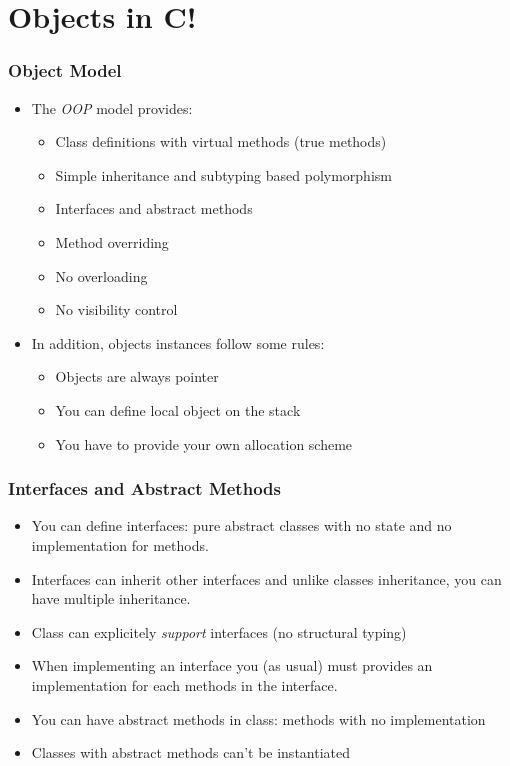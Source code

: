 \documentclass{beamer}
\newcommand{\cbang}{{\bf C!}}
\begin{document}
\section{Objects in \cbang{}}

\begin{frame}
  \frametitle{Object Model}
  \begin{itemize}
  \item The \emph{OOP} model provides:
    \begin{itemize}
    \item Class definitions with virtual methods (true methods)
    \item Simple inheritance and subtyping based polymorphism
    \item Interfaces and abstract methods
    \item Method overriding
    \item No overloading
    \item No visibility control
    \end{itemize}
  \item In addition, objects instances follow some rules:
    \begin{itemize}
    \item Objects are always pointer
    \item You can define local object on the stack
    \item You have to provide your own allocation scheme
    \end{itemize}
  \end{itemize}
\end{frame}

\begin{frame}
  \frametitle{Interfaces and Abstract Methods}
  \begin{itemize}
  \item You can define interfaces: pure abstract classes with no state and no
    implementation for methods.
  \item Interfaces can inherit other interfaces and unlike classes
    inheritance, you can have multiple inheritance.
  \item Class can explicitely \emph{support} interfaces (no structural typing)
  \item When implementing an interface you (as usual) must provides an
    implementation for each methods in the interface.
  \item You can have abstract methods in class: methods with no implementation
  \item Classes with abstract methods can't be instantiated
  \end{itemize}
\end{frame}
\end{document}
